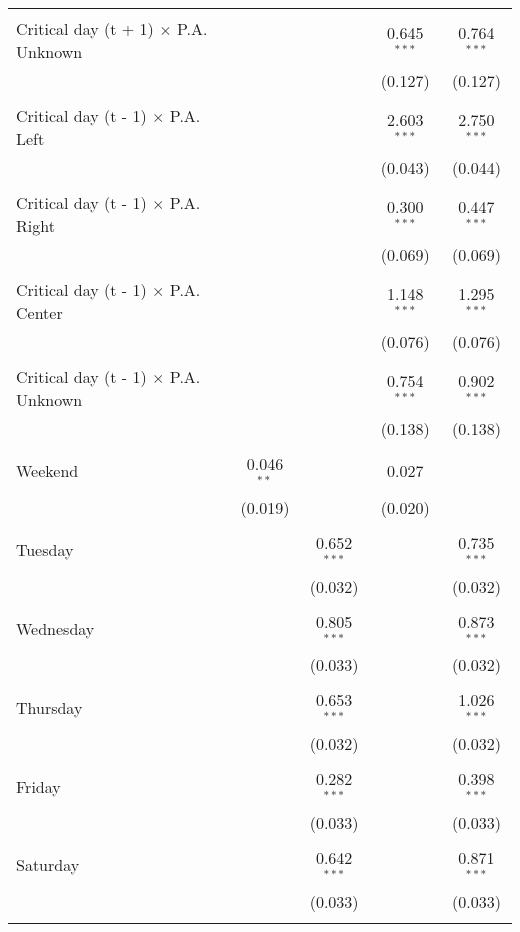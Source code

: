 \documentclass[
]{article}
\begin{document}
\begin{table}[!htbp]
{\begin{tabular}{@{\extracolsep{5pt}}lcccc}
  & & & & \\ 
 Critical day (t + 1) $\times$ P.A. Unknown &  &  & 0.645$^{***}$ & 0.764$^{***}$ \\ 
  &  &  & (0.127) & (0.127) \\ 
  & & & & \\ 
 Critical day (t - 1) $\times$ P.A. Left &  &  & 2.603$^{***}$ & 2.750$^{***}$ \\ 
  &  &  & (0.043) & (0.044) \\ 
  & & & & \\ 
 Critical day (t - 1) $\times$ P.A. Right &  &  & 0.300$^{***}$ & 0.447$^{***}$ \\ 
  &  &  & (0.069) & (0.069) \\ 
  & & & & \\ 
 Critical day (t - 1) $\times$ P.A. Center &  &  & 1.148$^{***}$ & 1.295$^{***}$ \\ 
  &  &  & (0.076) & (0.076) \\ 
  & & & & \\ 
 Critical day (t - 1) $\times$ P.A. Unknown &  &  & 0.754$^{***}$ & 0.902$^{***}$ \\ 
  &  &  & (0.138) & (0.138) \\ 
  & & & & \\ 
 Weekend & 0.046$^{**}$ &  & 0.027 &  \\ 
  & (0.019) &  & (0.020) &  \\ 
  & & & & \\ 
 Tuesday &  & 0.652$^{***}$ &  & 0.735$^{***}$ \\ 
  &  & (0.032) &  & (0.032) \\ 
  & & & & \\ 
 Wednesday &  & 0.805$^{***}$ &  & 0.873$^{***}$ \\ 
  &  & (0.033) &  & (0.032) \\ 
  & & & & \\ 
 Thursday &  & 0.653$^{***}$ &  & 1.026$^{***}$ \\ 
  &  & (0.032) &  & (0.032) \\ 
  & & & & \\ 
 Friday &  & 0.282$^{***}$ &  & 0.398$^{***}$ \\ 
  &  & (0.033) &  & (0.033) \\ 
  & & & & \\ 
 Saturday &  & 0.642$^{***}$ &  & 0.871$^{***}$ \\ 
  &  & (0.033) &  & (0.033) \\ 
  & & & & \\ 

\end{tabular}}
\end{table}
\end{document}
